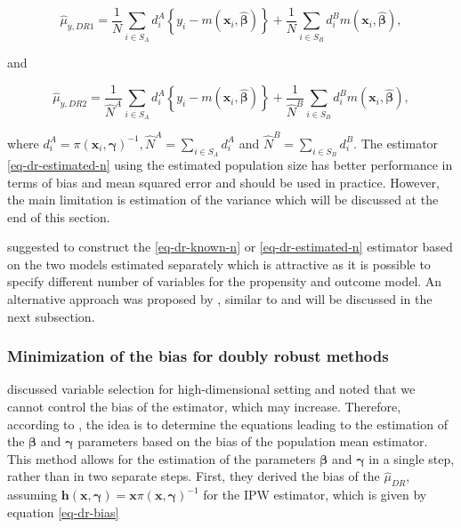 \documentclass[
]{jss}
\begin{document}
\begin{equation}
\hat{\mu}_{y,DR1}=\frac{1}{N} \sum_{i \in S_{A}} d_i^{A}\left\{y_i-m\left(\boldsymbol{x}_i, \hat{\boldsymbol{\beta}}\right)\right\}+\frac{1}{N} \sum_{i \in S_{B}} d_i^{B} m\left(\boldsymbol{x}_i, \hat{\boldsymbol{\beta}}\right),
\label{eq-dr-known-n}
\end{equation}

and

\begin{equation}
\hat{\mu}_{y,DR2}=\frac{1}{\hat{N}^{A}} \sum_{i \in S_{A}} d_i^{A}\left\{y_i-m\left(\boldsymbol{x}_i, \hat{\boldsymbol{\beta}}\right)\right\}+\frac{1}{\hat{N}^{B}} \sum_{i \in S_{B}} d_i^{B} m\left(\boldsymbol{x}_i, \hat{\boldsymbol{\beta}}\right),
\label{eq-dr-estimated-n}
\end{equation}

where
\(d_i^A=\pi\left(\boldsymbol{x}_i, \boldsymbol{\gamma}\right)^{-1}, \hat{N}^A=\sum_{i \in S_A} d_i^A\)
and \(\hat{N}^B=\sum_{i \in S_B} d_i^B\). The estimator
\eqref{eq-dr-estimated-n} using the estimated population size has better
performance in terms of bias and mean squared error and should be used
in practice. However, the main limitation is estimation of the variance
which will be discussed at the end of this section.

\citet{chen2020doubly} suggested to construct the \eqref{eq-dr-known-n}
or \eqref{eq-dr-estimated-n} estimator based on the two models estimated
separately which is attractive as it is possible to specify different
number of variables for the propensity and outcome model. An alternative
approach was proposed by \citet{yang_doubly_2020}, similar to
\citet{kim2014doubly} and will be discussed in the next subsection.

\subsubsection{Minimization of the bias for doubly robust
methods}\label{minimization-of-the-bias-for-doubly-robust-methods}

\citet{yang_doubly_2020} discussed variable selection for
high-dimensional setting and noted that we cannot control the bias of
the estimator, which may increase. Therefore, according to
\citet{yang_doubly_2020}, the idea is to determine the equations leading
to the estimation of the \(\boldsymbol{\beta}\) and
\(\boldsymbol{\gamma}\) parameters based on the bias of the population
mean estimator. This method allows for the estimation of the parameters
\(\boldsymbol{\beta}\) and \(\boldsymbol{\gamma}\) in a single step,
rather than in two separate steps. First, they derived the bias of the
\(\hat{\mu}_{DR}\), assuming
\(\boldsymbol{h}(\boldsymbol{x}, \boldsymbol{\gamma})=\boldsymbol{x}\pi(\boldsymbol{x}, \boldsymbol{\gamma})^{-1}\)
for the IPW estimator, which is given by equation \eqref{eq-dr-bias}
\end{document}
